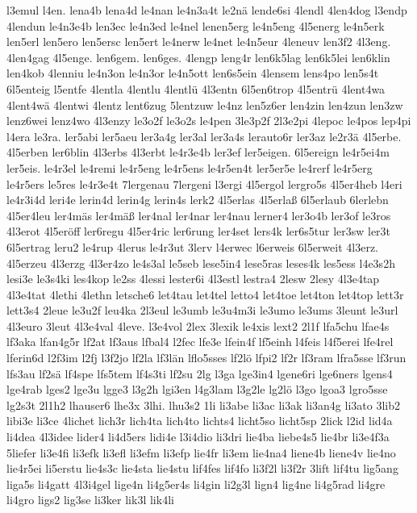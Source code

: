 {l3emul
l4en.
lena4b
lena4d
le4nan
le4n3a4t
le2nä
lende6si
4lendl
4len4dog
l3endp
4lendun
le4n3e4b
len3ec
le4n3ed
le4nel
lenen5erg
le4n5eng
4l5energ
le4n5erk
len5erl
len5ero
len5ersc
len5ert
le4nerw
le4net
le4n5eur
4leneuv
len3f2
4l3eng.
4len4gag
4l5enge.
len6gem.
len6ges.
4lengp
leng4r
len6k5lag
len6k5lei
len6klin
len4kob
4lenniu
le4n3on
le4n3or
le4n5ott
len6s5ein
4lensem
lens4po
len5s4t
6l5enteig
l5entfe
4lentla
4lentlu
4lentlü
4l3entn
6l5en6trop
4l5entrü
4lent4wa
4lent4wä
4lentwi
4lentz
lent6zug
5lentzuw
le4nz
len5z6er
len4zin
len4zun
len3zw
lenz6wei
lenz4wo
4l3enzy
le3o2f
le3o2s
le4pen
3le3p2f
2l3e2pi
4lepoc
le4pos
lep4pi
l4era
le3ra.
ler5abi
ler5aeu
ler3a4g
ler3al
ler3a4s
lerauto6r
ler3az
le2r3ä
4l5erbe.
4l5erben
ler6blin
4l3erbs
4l3erbt
le4r3e4b
ler3ef
ler5eigen.
6l5ereign
le4r5ei4m
ler5eis.
le4r3el
le4remi
le4r5eng
le4r5ens
le4r5en4t
ler5er5e
le4rerf
le4r5erg
le4r5ers
le5res
le4r3e4t
7lergenau
7lergeni
l3ergi
4l5ergol
lergro5s
4l5er4heb
l4eri
le4r3i4d
leri4e
lerin4d
lerin4g
lerin4s
lerk2
4l5erlas
4l5erlaß
6l5erlaub
6lerlebn
4l5er4leu
ler4mäs
ler4mäß
ler4nal
ler4nar
ler4nau
lerner4
ler3o4b
ler3of
le3ros
4l3erot
4l5eröff
ler6regu
4l5er4ric
ler6rung
ler4set
lers4k
ler6s5tur
ler3sw
ler3t
6l5ertrag
leru2
le4rup
4lerus
le4r3ut
3lerv
l4erwec
l6erweis
6l5erweit
4l3erz.
4l5erzeu
4l3erzg
4l3er4zo
le4s3al
le5seb
lese5in4
lese5ras
leses4k
les5ess
l4e3s2h
lesi3e
le3s4ki
les4kop
le2ss
4lessi
lester6i
4l3estl
lestra4
2lesw
2lesy
4l3e4tap
4l3e4tat
4lethi
4lethn
letsche6
let4tau
let4tel
letto4
let4toe
let4ton
let4top
lett3r
lett3s4
2leue
le3u2f
leu4ka
2l3eul
le3umb
le3u4m3i
le3umo
le3ums
3leunt
le3url
4l3euro
3leut
4l3e4val
4leve.
l3e4vol
2lex
3lexik
le4xis
lext2
2l1f
lfa5chu
lfae4s
lf3aka
lfan4g5r
lf2at
lf3aus
lfbal4
l2fec
lfe3e
lfein4f
lf5einh
l4feis
l4f5erei
lfe4rel
lferin6d
l2f3im
l2fj
l3f2jo
lf2la
lf3län
lflo5sses
lf2lö
lfpi2
lf2r
lf3ram
lfra5sse
lf3run
lfs3au
lf2sä
lf4spe
lfs5tem
lf4s3ti
lf2su
2lg
l3ga
lge3in4
lgene6ri
lge6ners
lgens4
lge4rab
lges2
lge3u
lgge3
l3g2h
lgi3en
l4g3lam
l3g2le
lg2lö
l3go
lgoa3
lgro5sse
lg2s3t
2l1h2
lhauser6
lhe3x
3lhi.
lhu3s2
1li
li3abe
li3ac
li3ak
li3an4g
li3ato
3lib2
libi3e
li3ce
4lichet
lich3r
lich4ta
lich4to
lichts4
licht5so
licht5sp
2lick
l2id
lid4a
li4dea
4l3idee
lider4
li4d5ers
lidi4e
l3i4dio
li3dri
lie4ba
liebe4s5
lie4br
li3e4f3a
5liefer
li3e4fi
li3efk
li3efl
li3efm
li3efp
lie4fr
li3em
lie4na4
liene4b
liene4v
lie4no
lie4r5ei
li5erstu
lie4s3c
lie4sta
lie4stu
lif4fes
lif4fo
li3f2l
li3f2r
3lift
lif4tu
lig5ang
liga5s
li4gatt
4l3i4gel
lige4n
li4g5er4s
li4gin
li2g3l
lign4
lig4ne
li4g5rad
li4gre
li4gro
ligs2
lig3se
li3ker
lik3l
lik4li
}
